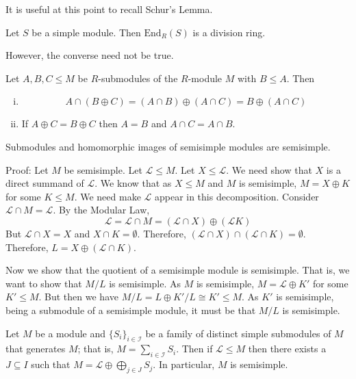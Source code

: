 It is useful at this point to recall Schur's Lemma.

\begin{lem}
Let $S$ be a simple module. Then $\text{End}_R(S)$ is a division ring.
\end{lem}

However, the converse need not be true.

\begin{lem}
Let $A,B,C \leq M$ be $R$-submodules of the $R$-module $M$ with $B \leq A$. Then
\begin{enumerate}[(i)]
\item 
\[
A \cap (B \oplus C) = (A \cap B) \oplus (A \cap C) = B \oplus (A \cap C)
\]
\item If $A \oplus C=B \oplus C$ then $A=B$ and $A \cap C= A \cap B$.
\end{enumerate}
\end{lem}

\begin{prop}
Submodules and homomorphic images of semisimple modules are semisimple.
\end{prop}

Proof: Let $M$ be semisimple. Let $\mathcal{L} \leq M$. Let $X \leq \mathcal{L}$. We need show that $X$ is a direct summand of $\mathcal{L}$. We know that as $X \leq M$ and $M$ is semisimple, $M=X \oplus K$ for some $K \leq M$. We need make $\mathcal{L}$ appear in this decomposition. Consider $\mathcal{L} \cap M=\mathcal{L}$. By the Modular Law,
\[
\mathcal{L}=\mathcal{L} \cap M=(\mathcal{L} \cap X) \oplus (\mathcal{L} K)
\]
But $\mathcal{L} \cap X=X$ and $X \cap K=\emptyset$. Therefore, $(\mathcal{L} \cap X) \cap (\mathcal{L} \cap K)=\emptyset$. Therefore, $L= X \oplus (\mathcal{L} \cap K)$. 

Now we show that the quotient of a semisimple module is semisimple. That is, we want to show that $M/L$ is semisimple. As $M$ is semisimple, $M=\mathcal{L} \oplus K'$ for some $K' \leq M$. But then we have $M/L=L \oplus K'/L \cong K' \leq M$. As $K'$ is semisimple, being a submodule of a semisimple module, it must be that $M/L$ is semisimple.  

\begin{lem}
Let $M$ be a module and $\{S_i\}_{i \in \mathcal{I}}$ be a family of distinct simple submodules of $M$ that generates $M$; that is, $M=\sum_{i \in \mathcal{I}} S_i$. Then if $\mathcal{L} \leq M$ then there exists a $J \subseteq I$ such that $M=\mathcal{L} \oplus \bigoplus_{j \in J} S_j$. In particular, $M$ is semisimple. 
\end{lem}

